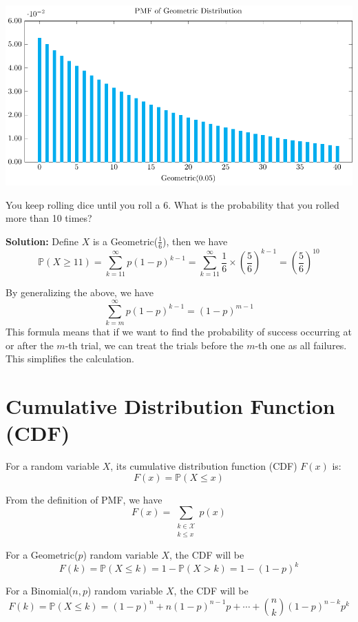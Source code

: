 \includegraphics{Figures/PMF_Geometric_005.pdf}

\begin{eg}
You keep rolling dice until you roll a 6. What is the probability that you rolled more than 10 times? 

\textbf{Solution:} 
Define \(X\) is a Geometric(\(\frac{1}{6}\)), then we have 
\[ 
  \mathbb{P}(X \geq 11) = \sum_{k = 11}^{\infty} p(1 - p)^{k-1} = \sum_{k = 11}^{\infty} \dfrac{1}{6} \times (\dfrac{5}{6})^{k-1} = \left(\dfrac{5}{6}\right)^{10}
\]
\end{eg}

By generalizing the above, we have 
\[
  \sum_{k = m}^{\infty} p(1 - p)^{k-1} = (1 - p)^{m-1}   
\]
This formula means that if we want to find the probability of success occurring at or after the \(m\)-th trial, we can treat the trials before the \(m\)-th one as all failures. This simplifies the calculation.

\section{Cumulative Distribution Function (CDF)}
\begin{definition}
  For a random variable \(X\), its cumulative distribution function (CDF) \(F(x)\) is:
  \[
    F(x) = \mathbb{P}(X \leq x)
  \]
\end{definition}

From the definition of PMF, we have 
\[
  F(x) = \sum_{\substack{k \in \mathcal{X} \\ k \leq x}} p(x) 
\]

For a Geometric(\(p\)) random variable \(X\), the CDF will be 
\[
  F(k) = \mathbb{P}(X \leq k) = 1 - \mathbb{P}(X > k) = 1- (1 - p)^k
\]

For a Binomial(\(n, p\)) random variable \(X\), the CDF will be 
\[
  F(k) = \mathbb{P}(X \leq k) = (1 - p)^n + n(1 - p)^{n-1}p + \cdots + \binom{n}{k} (1 - p)^{n-k} p^k
\]

